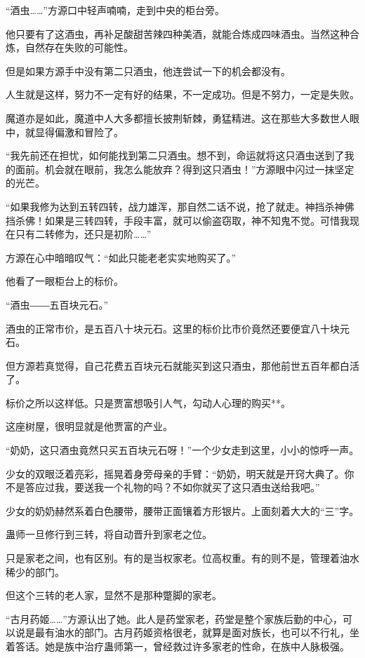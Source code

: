 
\begin{this_body}

“酒虫……”方源口中轻声喃喃，走到中央的柜台旁。

他只要有了这酒虫，再补足酸甜苦辣四种美酒，就能合炼成四味酒虫。当然这种合炼，自然存在失败的可能性。

但是如果方源手中没有第二只酒虫，他连尝试一下的机会都没有。

人生就是这样，努力不一定有好的结果，不一定成功。但是不努力，一定是失败。

魔道亦是如此，魔道中人大多都擅长披荆斩棘，勇猛精进。这在那些大多数世人眼中，就显得偏激和冒险了。

“我先前还在担忧，如何能找到第二只酒虫。想不到，命运就将这只酒虫送到了我的面前。机会就在眼前，我怎么能放弃？得到这只酒虫！”方源眼中闪过一抹坚定的光芒。

“如果我修为达到五转四转，战力雄浑，那自然二话不说，抢了就走。神挡杀神佛挡杀佛！如果是三转四转，手段丰富，就可以偷盗窃取，神不知鬼不觉。可惜我现在只有二转修为，还只是初阶……”

方源在心中暗暗叹气：“如此只能老老实实地购买了。”

他看了一眼柜台上的标价。

“酒虫――五百块元石。”

酒虫的正常市价，是五百八十块元石。这里的标价比市价竟然还要便宜八十块元石。

但方源若真觉得，自己花费五百块元石就能买到这只酒虫，那他前世五百年都白活了。

标价之所以这样低。只是贾富想吸引人气，勾动人心理的购买**。

这座树屋，很明显就是他贾富的产业。

“奶奶，这只酒虫竟然只买五百块元石呀！”一个少女走到这里，小小的惊呼一声。

少女的双眼泛着亮彩，摇晃着身旁母亲的手臂：“奶奶，明天就是开窍大典了。你不是答应过我，要送我一个礼物的吗？不如你就买了这只酒虫送给我吧。”

少女的奶奶赫然系着白色腰带，腰带正面镶着方形银片。上面刻着大大的“三”字。

蛊师一旦修行到三转，将自动晋升到家老之位。

只是家老之间，也有区别。有的是当权家老。位高权重。有的则不是，管理着油水稀少的部门。

但这个三转的老人家，显然不是那种蹩脚的家老。

“古月药姬……”方源认出了她。此人是药堂家老，药堂是整个家族后勤的中心，可以说是最有油水的部门。古月药姬资格很老，就算是面对族长，也可以不行礼，坐着答话。她是族中治疗蛊师第一，曾经救过许多家老的性命，在族中人脉极强。


\end{this_body}
